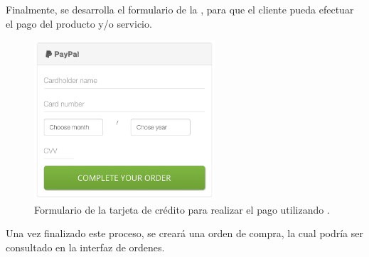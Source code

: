 		Finalmente, se desarrolla el formulario de la , para que el cliente pueda efectuar el pago del producto y/o servicio.

		\begin{figure}[H]
			\centering
			\includegraphics[width=0.6\textwidth]{figuras/payment/credit_card_form.png}
			\caption{Formulario de la tarjeta de crédito para realizar el pago utilizando \PPPaymentProNAME.}
			\label{figure:checkout:payment:paypal_payflow:form}
		\end{figure}

		Una vez finalizado este proceso, se creará una orden de compra, la cual podría ser consultado en la interfaz de ordenes.